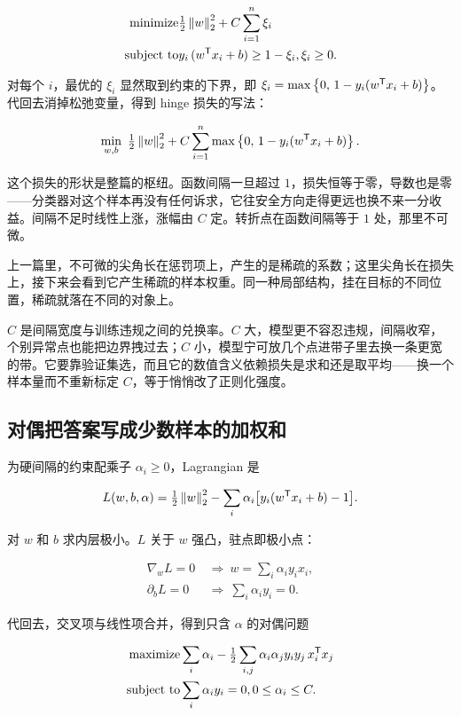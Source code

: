 \[
\begin{aligned}
\text{minimize}\space & \tfrac12\left\lVert w\right\rVert_2^2+C\sum_{i=1}^n\xi_i\\
\text{subject to}\space & y_i\,(w^{\mathsf{T}}x_i+b)\ge1-\xi_i,\space \xi_i\ge0 .
\end{aligned}
\]

对每个 \(i\)，最优的 \(\xi_i\) 显然取到约束的下界，即 \(\xi_i=\max\left\{0,\,1-y_i(w^{\mathsf{T}}x_i+b)\right\}\)。代回去消掉松弛变量，得到 hinge 损失的写法：

\[
\min_{w,b}\ \tfrac12\norm{w}_2^2+C\sum_{i=1}^n\max\set{0,\,1-y_i(w^{\trans}x_i+b)} .
\]

这个损失的形状是整篇的枢纽。函数间隔一旦超过 \(1\)，损失恒等于零，导数也是零——分类器对这个样本再没有任何诉求，它往安全方向走得更远也换不来一分收益。间隔不足时线性上涨，涨幅由 \(C\) 定。转折点在函数间隔等于 \(1\) 处，那里不可微。

上一篇里，不可微的尖角长在惩罚项上，产生的是稀疏的系数；这里尖角长在损失上，接下来会看到它产生稀疏的样本权重。同一种局部结构，挂在目标的不同位置，稀疏就落在不同的对象上。

\(C\) 是间隔宽度与训练违规之间的兑换率。\(C\) 大，模型更不容忍违规，间隔收窄，个别异常点也能把边界拽过去；\(C\) 小，模型宁可放几个点进带子里去换一条更宽的带。它要靠验证集选，而且它的数值含义依赖损失是求和还是取平均——换一个样本量而不重新标定 \(C\)，等于悄悄改了正则化强度。

\subsection{对偶把答案写成少数样本的加权和}

为硬间隔的约束配乘子 \(\alpha_i\ge0\)，Lagrangian 是

\[
L(w,b,\alpha)=\tfrac12\left\lVert w\right\rVert_2^2-\sum_i\alpha_i\bigl[y_i(w^{\mathsf{T}}x_i+b)-1\bigr].
\]

对 \(w\) 和 \(b\) 求内层极小。\(L\) 关于 \(w\) 强凸，驻点即极小点：

\[
\begin{aligned}
\nabla_wL=0 &\ \Longrightarrow\ w=\sum_i\alpha_iy_ix_i,\\
\partial_bL=0 &\ \Longrightarrow\ \sum_i\alpha_iy_i=0 .
\end{aligned}
\]

代回去，交叉项与线性项合并，得到只含 \(\alpha\) 的对偶问题

\[
\begin{aligned}
\text{maximize}\space & \sum_i\alpha_i-\tfrac12\sum_{i,j}\alpha_i\alpha_jy_iy_j\,x_i^{\mathsf{T}}x_j\\
\text{subject to}\space & \sum_i\alpha_iy_i=0,\space 0\le\alpha_i\le C .
\end{aligned}
\]

